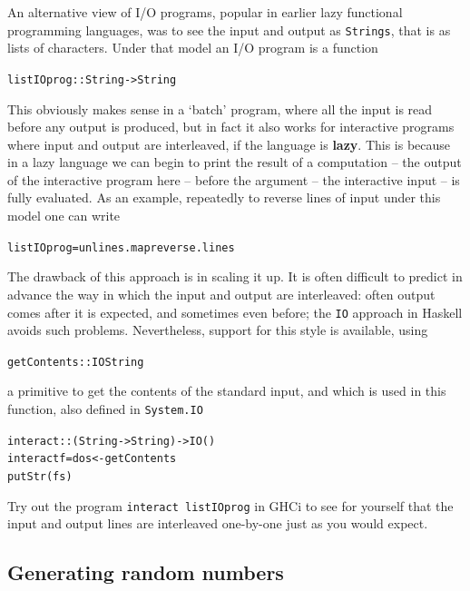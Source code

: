 An alternative view of I/O programs, popular in earlier lazy functional 
programming languages, was to see the input and output as
\texttt{Strings}, that is as lists of characters. Under that model an
I/O program is a function
\begin{alltt}
listIOprog :: String -> String
\end{alltt}
This obviously makes sense in a `batch' program, where all the input is
read before any output is produced, but in fact it also works for
interactive programs where input and output are interleaved, if the
language is \textbf{lazy}. This is because in a lazy language we can
begin to print the result of a computation -- the output of the
interactive program here -- before the argument -- the interactive input --
is fully evaluated. As an example, repeatedly to reverse lines of input
under this model one can write
\begin{alltt}
listIOprog  = unlines . map reverse . lines
\end{alltt}
The drawback of this approach is in scaling it up. It is often difficult
to predict in advance the way in which the input and output are
interleaved: often output comes after it is expected, and sometimes even
before; the \texttt{IO} approach in Haskell avoids such problems.
Nevertheless, support for this style is available, using
\begin{alltt}
getContents :: IO String
\end{alltt}
a primitive to get the contents of the standard input, and which is used
in this function, also defined in \texttt{System.IO}
\begin{alltt}
interact :: (String -> String) -> IO ()
interact f = do s <- getContents
                putStr (f s)
\end{alltt}
Try out the program \texttt{interact listIOprog} in GHCi to see for yourself that the input and output lines are interleaved one-by-one just as you would expect.

\subsection*{Generating random numbers}

